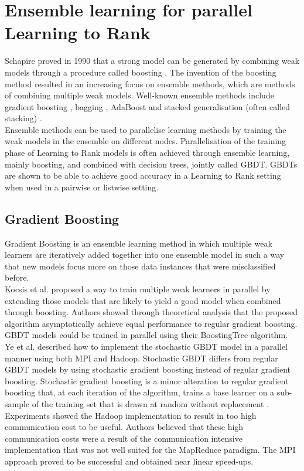 \section{Ensemble learning for parallel Learning to Rank}
Schapire proved in 1990 that a strong model can be generated by combining weak models through a procedure called boosting \cite{Schapire1990}. The invention of the boosting method resulted in an increasing focus on ensemble methods, which are methods of combining multiple weak models. Well-known ensemble methods include gradient boosting \cite{Friedman2001}, bagging \cite{Breiman1996}, AdaBoost \cite{Freund1997} and stacked generalisation (often called stacking) \cite{Wolpert1992}.\\

Ensemble methods can be used to parallelise learning methods by training the weak models in the ensemble on different nodes. Parallelisation of the training phase of Learning to Rank models is often achieved through ensemble learning, mainly boosting, and combined with decision trees, jointly called \acf{GBDT}. \ac{GBDT}s are shown to be able to achieve good accuracy in a Learning to Rank setting when used in a pairwise \cite{Zheng2007} or listwise \cite{Chen2008} setting.

\subsection{Gradient Boosting}
Gradient Boosting \cite{Friedman2001} is an ensemble learning method in which multiple weak learners are iteratively added together into one ensemble model in such a way that new models focus more on those data instances that were misclassified before.\\

Kocsis et al. \cite{Kocsis2013} proposed a way to train multiple weak learners in parallel by extending those models that are likely to yield a good model when combined through boosting. Authors showed through theoretical analysis that the proposed algorithm asymptotically achieve equal performance to regular gradient boosting. \ac{GBDT} models could be trained in parallel using their BoostingTree algorithm.\\

Ye et al. \cite{Ye2009} described how to implement the stochastic \ac{GBDT} model in a parallel manner using both \ac{MPI} and Hadoop. Stochastic \ac{GBDT} differs from regular \ac{GBDT} models by using stochastic gradient boosting instead of regular gradient boosting. Stochastic gradient boosting is a minor alteration to regular gradient boosting that, at each iteration of the algorithm, trains a base learner on a sub-sample of the training set that is drawn at random without replacement \cite{Friedman2002}. Experiments showed the Hadoop implementation to result in too high communication cost to be useful. Authors believed that these high communication costs were a result of the communication intensive implementation that was not well suited for the MapReduce paradigm. The \ac{MPI} approach proved to be successful and obtained near linear speed-ups.\\

